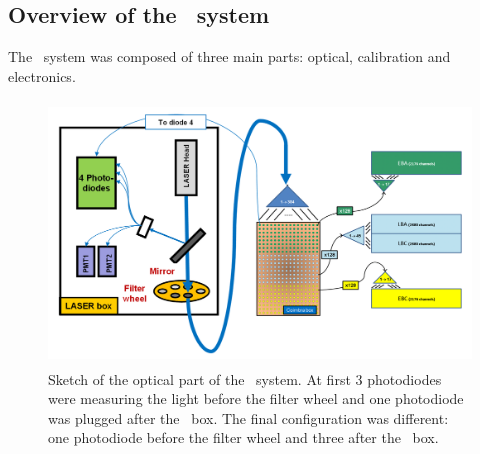 
\subsection{Overview of the \lasi~system}

The \lasi~system \cite{ref:lasercalvet} was composed of three main parts: optical, calibration and electronics.

\begin{figure}[htbp]
\centering
\includegraphics[height=7cm]{figures/FullSystem.png}
\caption{Sketch of the optical part of the \lasi~system. At first 3 photodiodes were measuring the light before the filter wheel and one photodiode was plugged after the \coimbra~box. The final configuration was different: one photodiode before the filter wheel and three after the \coimbra~box.}\label{fig:lasaoptical}
\end{figure}


